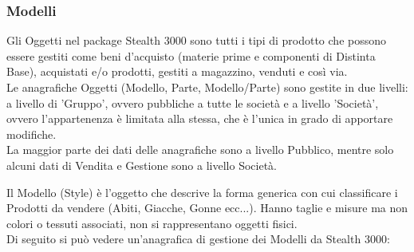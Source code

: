 \subsubsection{Modelli}
Gli Oggetti nel package Stealth 3000 sono tutti i tipi di prodotto che possono essere gestiti come beni d’acquisto (materie prime e componenti di Distinta Base), acquistati e/o prodotti, gestiti a magazzino, venduti e così via. \\
Le anagrafiche Oggetti (Modello, Parte, Modello/Parte) sono gestite in due livelli: a livello di 'Gruppo', ovvero pubbliche a tutte le società e a livello 'Società', ovvero l'appartenenza è limitata alla stessa, che è l'unica in grado di apportare modifiche.\\
 La maggior parte dei dati delle anagrafiche sono a livello Pubblico, mentre solo alcuni dati di Vendita e Gestione sono a livello Società.

Il Modello (Style) è l’oggetto che descrive la forma generica con cui classificare i Prodotti da vendere (Abiti, Giacche, Gonne ecc...). Hanno taglie e misure ma non colori o tessuti associati, non si rappresentano oggetti fisici.\\ 
Di seguito si può vedere un'anagrafica di gestione dei Modelli da Stealth 3000:


